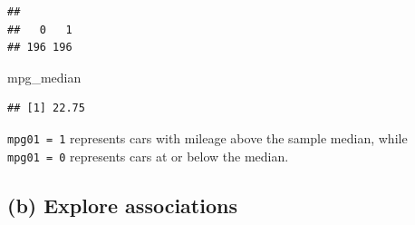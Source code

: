 \documentclass[
]{article}
\newenvironment{Shaded}{\begin{snugshade}}{\end{snugshade}}
\newcommand{\NormalTok}[1]{#1}
\begin{document}
\begin{verbatim}
## 
##   0   1 
## 196 196
\end{verbatim}

\begin{Shaded}
\begin{Highlighting}[]
\NormalTok{mpg\_median}
\end{Highlighting}
\end{Shaded}

\begin{verbatim}
## [1] 22.75
\end{verbatim}

\texttt{mpg01\ =\ 1} represents cars with mileage above the sample
median, while \texttt{mpg01\ =\ 0} represents cars at or below the
median.

\subsection{(b) Explore associations}\label{b-explore-associations}
\end{document}

